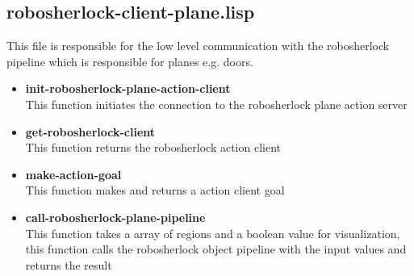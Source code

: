 \documentclass[main.tex]{subfiles}
\begin{document}
		\subsection{robosherlock-client-plane.lisp}
		This file is responsible for the low level communication with the robosherlock pipeline which is responsible for planes e.g. doors.
		\begin{itemize}
			\item \textbf{init-robosherlock-plane-action-client} \\
			This function initiates the connection to the robosherlock plane action server
			\item \textbf{get-robosherlock-client} \\
			This function returns the robosherlock action client
			\item \textbf{make-action-goal} \\
			This function makes and returns a action client goal
			\item \textbf{call-robosherlock-plane-pipeline} \\
			This function takes a array of regions and a boolean value for visualization, this function calls the robosherlock object pipeline with the input values and returns the result
		\end{itemize}
	\endgroup
\end{document}
